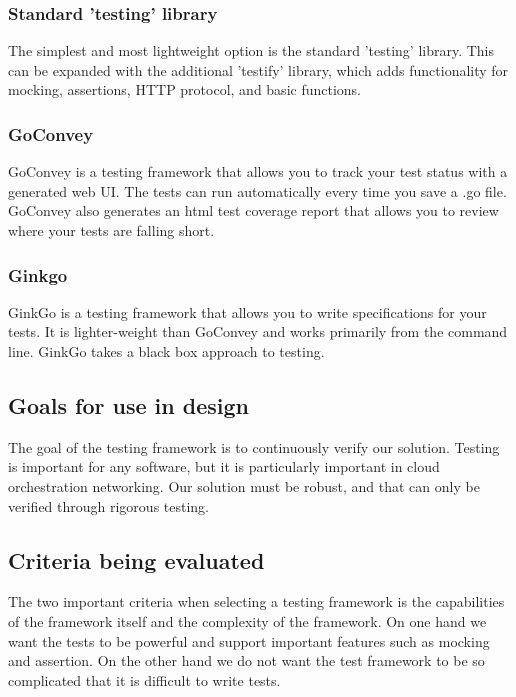 \documentclass[10pt,letterpaper,onecolumn,journal]{IEEEtran}
\begin{document}
\subsubsection{Standard 'testing' library}

The simplest and most lightweight option is the standard 'testing' library. This
can be expanded with the additional 'testify' library, which adds functionality
for mocking, assertions, HTTP protocol, and basic functions.

\subsubsection{GoConvey}

GoConvey is a testing framework that allows you to track your test status with a
generated web UI. The tests can run automatically every time you save a .go
file. GoConvey also generates an html test coverage report that allows you to
review where your tests are falling short.

\subsubsection{Ginkgo}

GinkGo is a testing framework that allows you to write specifications for your
tests. It is lighter-weight than GoConvey and works primarily from the command
line. GinkGo takes a black box approach to testing.

\subsection{Goals for use in design}

The goal of the testing framework is to continuously verify our solution.
Testing is important for any software, but it is particularly important in cloud
orchestration networking. Our solution must be robust, and that can only be
verified through rigorous testing.

\subsection{Criteria being evaluated}

The two important criteria when selecting a testing framework is the
capabilities of the framework itself and the complexity of the framework. On one
hand we want the tests to be powerful and support important features such as
mocking and assertion. On the other hand we do not want the test framework to be
so complicated that it is difficult to write tests.
\end{document}
